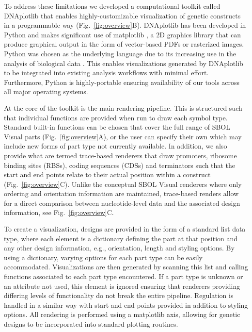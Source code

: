 \documentclass{bioinfo}
\begin{document}
To address these limitations we developed a computational toolkit called DNAplotlib that enables highly-customizable visualization of genetic constructs in a programmable way (Fig.~\ref{fig:overview}B). DNAplotlib has been developed in Python and makes significant use of matplotlib \citep{Hunter07a}, a 2D graphics library that can produce graphical output in the form of vector-based PDFs or rasterized images. Python was chosen as the underlying language due to its increasing use in the analysis of biological data \citep{Cock09a}. This enables visualizations generated by DNAplotlib to be integrated into existing analysis workflows with minimal effort. Furthermore, Python is highly-portable ensuring availability of our tools across all major operating systems.

At the core of the toolkit is the main rendering pipeline. This is structured such that individual functions are provided when run to draw each symbol type. Standard built-in functions can be chosen that cover the full range of SBOL Visual parts (Fig.~\ref{fig:overview}A), or the user can specify their own which may include new forms of part type not currently available. In addition, we also provide what are termed trace-based renderers that draw promoters, ribosome binding sites (RBSs), coding sequences (CDSs) and terminators such that the start and end points relate to their actual position within a construct (Fig.~\ref{fig:overview}C). Unlike the conceptual SBOL Visual renderers where only ordering and orientation information are maintained, trace-based renders allow for a direct comparison between nucleotide-level data and the associated design information, see Fig.~\ref{fig:overview}C.

To create a visualization, designs are provided in the form of a standard list data type, where each element is a dictionary defining the part at that position and any other design information, e.g., orientation, length and styling options. By using a dictionary, varying options for each part type can be easily accommodated. Visualizations are then generated by scanning this list and calling functions associated to each part type encountered. If a part type is unknown or an attribute not used, this element is ignored ensuring that renderers providing differing levels of functionality do not break the entire pipeline. Regulation is handled in a similar way with start and end points provided in addition to styling options. All rendering is performed using a matplotlib axis, allowing for genetic designs to be incorporated into standard plotting routines.
\end{document}
